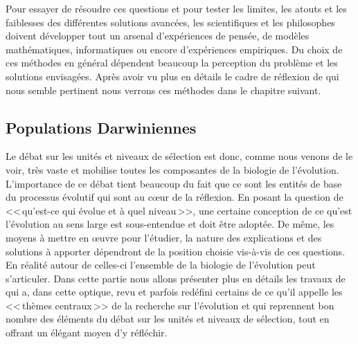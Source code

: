 Pour essayer de résoudre ces questions et pour tester les limites, les atouts et les faiblesses des différentes solutions avancées, les scientifiques et les philosophes doivent développer tout un arsenal d'expériences de pensée, de modèles mathématiques, informatiques ou encore d'expériences empiriques. Du choix de ces méthodes en général dépendent beaucoup la perception du problème et les solutions envisagées. Après avoir vu plus en détails le cadre de réflexion de \cite{godfrey2009darwinian} qui nous semble pertinent nous verrons ces méthodes dans le chapitre suivant.

\subsection{Populations Darwiniennes}\label{sec:pgs}

Le débat sur les unités et niveaux de sélection est donc, comme nous venons de le voir, très vaste et mobilise toutes les composantes de la biologie de l'évolution. L'importance de ce débat tient beaucoup du fait que ce sont les entités de base du processus évolutif qui sont au c{\oe}ur de la réflexion. En posant la question de <<\,qu'est-ce qui évolue et à quel niveau\,>>, une certaine conception de ce qu'est l'évolution au sens large est sous-entendue et doit être adoptée. De même, les moyens à mettre en {\oe}uvre pour l'étudier, la nature des explications et des solutions à apporter dépendront de la position choisie vis-à-vis de ces questions. En réalité autour de celles-ci l'ensemble de la biologie de l'évolution peut s'articuler. Dans cette partie nous allons présenter plus en détails les travaux de \cite{godfrey2009darwinian} qui a, dans cette optique, revu et parfois redéfini certains de ce qu'il appelle les <<\,thèmes centraux\,>> \citep[p.~4]{godfrey2009darwinian} de la recherche sur l'évolution et qui reprennent bon nombre des éléments du débat sur les unités et niveaux de sélection, tout en offrant un élégant moyen d'y réfléchir.


